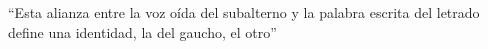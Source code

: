\enquote{Esta alianza entre la voz oída del subalterno y la palabra escrita del letrado define una identidad, la del gaucho, el otro} \autocite[29]{Ludmer1991}

